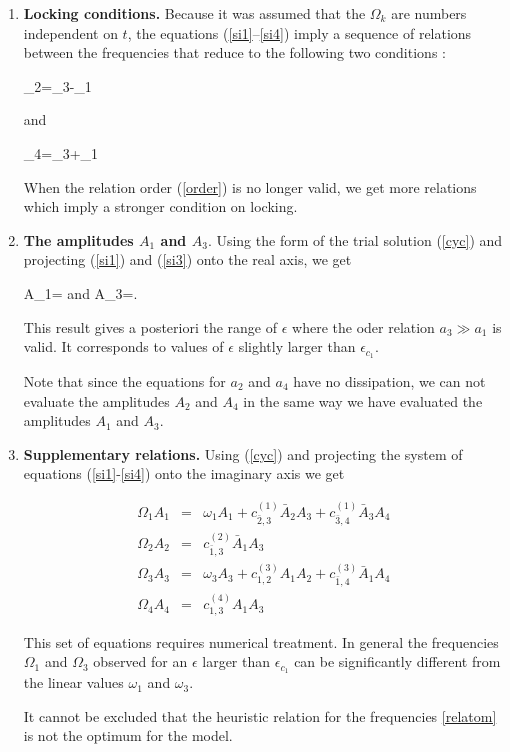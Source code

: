 \begin{enumerate}
\item {\bf Locking conditions.} Because it was assumed
that the $\Omega_k$ are numbers independent on $t$,
the equations (\ref{si1}--\ref{si4}) imply a sequence of relations between
the frequencies that reduce to the following two conditions :

\beq\label{reom1}
\Omega_2=\Omega_3-\Omega_1
\eeq

and 

\beq\label{reom2}
\Omega_4=\Omega_3+\Omega_1
\eeq

\begin{rem}
When the relation order (\ref{order}) 
is no longer valid, we get more relations
which imply a stronger condition on locking.
\end{rem}

\item {\bf The amplitudes $A_1$ and $A_3$}. 
Using the form of the trial solution
(\ref{cyc}) and projecting (\ref{si1}) and (\ref{si3}) onto the real
axis, we get 

\beq\label{a1}
A_1=
\eeq
and
\beq\label{a2}
A_3=.
\eeq

\begin{rem}
This result gives a posteriori the range of $\epsilon$ where the
oder relation  $a_3\gg a_1$ is valid. It corresponds to  values of
$\epsilon$ slightly larger than $\epsilon_{c_1}$. 
\end{rem}

\begin{rem}
Note that since the equations for $a_2$ and $a_4$ have no
dissipation, we can not evaluate the amplitudes $A_2$ and $A_4$
in the same way we have evaluated the amplitudes $A_1$ and $A_3$.
\end{rem}


\item {\bf Supplementary relations.} Using  (\ref{cyc})
and projecting the system of equations (\ref{si1}-\ref{si4}) onto the 
imaginary axis we get


\begin{eqnarray}
\Omega_1{A}_1&=&\omega_1A_1+c^{(1)}_{\bar{2},3}\bar{A}_2{A}_3+c^{(1)}_{\bar{3},4}\bar{A}_3A_4\\
\Omega_2{A}_2&=&c^{(2)}_{\bar{1},3}\bar{A}_1{A}_3\\
\Omega_3{A}_3&=&\omega_3A_3+c^{(3)}_{1,2}A_1A_2+c^{(3)}_{\bar{1},4}\bar{A}_1A_4\\
\Omega_4{A}_4&=&c^{(4)}_{1,3}A_1A_3
\end{eqnarray}

This set of equations requires numerical treatment. In general
the frequencies $\Omega_1$ and  $\Omega_3$ observed for an 
$\epsilon$ larger than $\epsilon_{c_1}$ can be significantly
different  from the linear values  $\omega_1$ and  $\omega_3$.

\begin{rem}
It cannot be excluded  that the  heuristic relation 
for the frequencies \ref{relatom} is not the optimum for the model.
\end{rem}
\end{enumerate}
